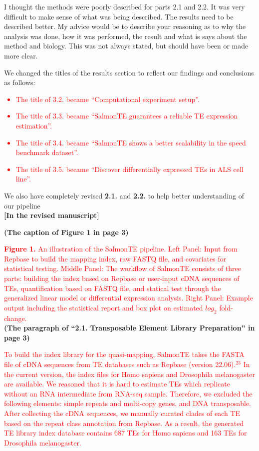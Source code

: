 \documentclass[10pt]{article}
\begin{document}
\begin{response}{
I thought the methods were poorly described for parts 2.1 and 2.2. It was very difficult to make sense of what was being described. The results need to be described better. My advice would be to describe your reasoning as to why the analysis was done, how it was performed, the result and what is says about the method and biology. This was not always stated, but should have been or made more clear.}

We changed the titles of the results section to reflect our findings and conclusions as follows:
\textcolor{red}{
\begin{itemize}
	\item The title of 3.2. became ``Computational experiment setup''.
    \item The title of 3.3. became ``SalmonTE guarantees a reliable TE expression estimation''.
    \item The title of 3.4. became ``SalmonTE shows a better scalability in the speed benchmark dataset''.
	\item The title of 3.5. became ``Discover differentially expressed TEs in ALS cell line''.
\end{itemize}}

We also have completely revised \textbf{2.1.} and  \textbf{2.2.} to help better understanding of our pipeline\\


\noindent\textbf{[In the revised manuscript]} 

\noindent\textbf{(The caption of Figure 1 in page 3)}

\textcolor{red}{
\textbf{Figure 1.} An illustration of the SalmonTE pipeline. Left Panel: Input from Repbase to build the mapping index, raw FASTQ file, and covariates for statistical testing. Middle Panel: The workflow of SalmonTE consists of three parts: building the index based on Repbase or user-input cDNA sequences of TEs, quantification based on FASTQ file, and statical test through the generalized linear model or differential expression analysis. Right Panel: Example output including the statistical report and box plot on estimated $log_2$ fold-change.
}\\

\noindent\textbf{(The paragraph of ``2.1. Transposable Element Library Preparation'' in page 3)}

\textcolor{red}{
To build the index library for the quasi-mapping, SalmonTE takes the FASTA file of cDNA sequences from TE databases such as Repbase (version 22.06).$^{23}$ In the current version, the index files for Homo sapiens and Drosophila melanogaster are available. We reasoned that it is hard to estimate TEs which replicate without an RNA intermediate from RNA-seq sample.
Therefore, we excluded the following elements: simple repeats and multi-copy genes, and DNA transposable. After collecting the cDNA sequences, we manually curated clades of each TE based on the repeat class annotation from Repbase.
As a result, the generated TE library index database contains 687 TEs for Homo sapiens and 163 TEs for Drosophila melanogaster.
}\\


\end{response}
\end{document}
